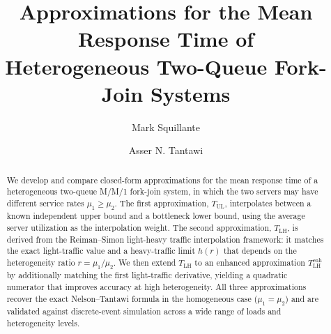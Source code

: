 \documentclass[11pt]{article}
\title{Approximations for the Mean Response Time of\\
       Heterogeneous Two-Queue Fork-Join Systems}
\author[]{Mark Squillante}
\author[]{Asser N. Tantawi}
\affil[]{IBM T. J. Watson Research Center, Yorktown Heights, NY \\
       \texttt{\{mss, tantawi\}@us.ibm.com}}
\date{}
\newcommand{\Tul}{T_{\text{UL}}}
\newcommand{\Tlh}{T_{\text{LH}}}
\newcommand{\Tlhe}{T_{\text{LH}}^{\text{enh}}}
\begin{document}
\maketitle

\begin{abstract}
We develop and compare closed-form approximations for the mean response time
of a heterogeneous two-queue M/M/1 fork-join system, in which the two servers
may have different service rates $\mu_1 \geq \mu_2$.
The first approximation, $\Tul$, interpolates between a known independent upper
bound and a bottleneck lower bound, using the average server utilization as the
interpolation weight.
The second approximation, $\Tlh$, is derived from the Reiman--Simon light-heavy
traffic interpolation framework: it matches the exact light-traffic value and a
heavy-traffic limit $h(r)$ that depends on the heterogeneity ratio
$r = \mu_1/\mu_2$.
We then extend $\Tlh$ to an enhanced approximation $\Tlhe$ by additionally
matching the first light-traffic derivative, yielding a quadratic numerator
that improves accuracy at high heterogeneity.
All three approximations recover the exact Nelson--Tantawi formula in the
homogeneous case ($\mu_1 = \mu_2$) and are validated against discrete-event
simulation across a wide range of loads and heterogeneity levels.
\end{abstract}











\end{document}

